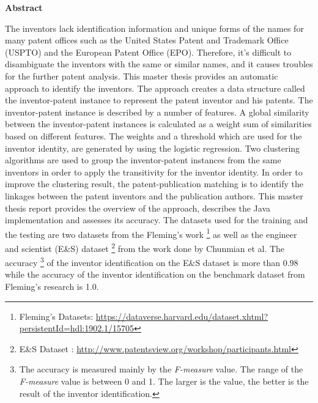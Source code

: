 \thispagestyle{empty}

\centerline{\Large{\textbf{Abstract}}}

\vspace{2cm}
The inventors lack identification information and unique forms of the names for many patent offices such as the United States Patent and Trademark Office (USPTO) and the European Patent Office (EPO). Therefore, it's difficult to disambiguate the inventors with the same or similar names, and it causes troubles for the further patent analysis. This master thesis provides an automatic approach to identify the inventors. The approach creates a data structure called the inventor-patent instance to represent the patent inventor and his patents. The inventor-patent instance is described by a number of features. A global similarity between the inventor-patent instances is calculated as a weight sum of similarities based on different features. The weights and a threshold which are used for the inventor identity, are generated by using the logistic regression. Two clustering algorithms are used to group the inventor-patent instances from the same inventors in order to apply the transitivity for the inventor identity. In order to improve the clustering result, the patent-publication matching is to identify the linkages between the patent inventors and the publication authors. This master thesis report provides  the overview of the approach, describes the Java implementation and assesses its accuracy. The datasets used for the training and the testing  are two datasets from the Fleming's work \footnote{Fleming's Datasets: \url{https://dataverse.harvard.edu/dataset.xhtml? persistentId=hdl:1902.1/15705}} as well as the engineer and scientist (E\&S) dataset \footnote{E\&S Dataset : \url{http://www.patentsview.org/workshop/participants.html}} from the work done by Chunmian et al. The accuracy \footnote{The accuracy is measured mainly by the \emph{F-measure} value. The range of the \emph{F-measure} value is between 0 and 1. The larger is the value, the better is the result of the inventor identification. } of the inventor identification on the E\&S dataset is more than 0.98 while the accuracy of the inventor identification on the benchmark dataset from Fleming's research is 1.0.



